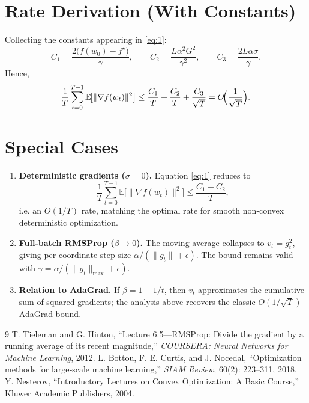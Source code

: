 \documentclass[11pt]{article}
\newcommand{\E}{\mathbb{E}}
\begin{document}
\section*{Rate Derivation (With Constants)}
Collecting the constants appearing in \eqref{eq:1}:
\[
C_{1}= \frac{2\big(f(w_0)-f^\star\big)}{\gamma},\qquad
C_{2}= \frac{L\alpha^{2} G^{2}}{\gamma^{2}},\qquad
C_{3}= \frac{2L\alpha\sigma}{\gamma}.
\]
Hence,
\[
\frac{1}{T}\sum_{t=0}^{T-1}\E\!\big[\|\nabla f(w_t)\|^{2}\big]
\le \frac{C_{1}}{T}+\frac{C_{2}}{T}+ \frac{C_{3}}{\sqrt{T}}
= O\!\Bigl(\frac{1}{\sqrt{T}}\Bigr).
\]

\section*{Special Cases}
\begin{enumerate}[label=\arabic*.]
\item \textbf{Deterministic gradients ($\sigma=0$).} Equation \eqref{eq:1} reduces to
\[
\frac{1}{T}\sum_{t=0}^{T-1}\E\!\big[\|\nabla f(w_t)\|^{2}\big]
\le \frac{C_{1}+C_{2}}{T},
\]
i.e. an $O(1/T)$ rate, matching the optimal rate for smooth non‑convex deterministic optimization.
\item \textbf{Full‑batch RMSProp ($\beta\to 0$).} The moving average collapses to $v_t=g_t^{2}$, giving per‑coordinate step size $\alpha/(\|g_t\|+\epsilon)$. The bound remains valid with $\gamma=\alpha/(\|g_t\|_{\max}+\epsilon)$.
\item \textbf{Relation to AdaGrad.} If $\beta=1-1/t$, then $v_t$ approximates the cumulative sum of squared gradients; the analysis above recovers the classic $O(1/\sqrt{T})$ AdaGrad bound.
\end{enumerate}

\newpage
\begin{thebibliography}{9}
T. Tieleman and G. Hinton, ``Lecture 6.5—RMSProp: Divide the gradient by a running average of its recent magnitude,'' \emph{COURSERA: Neural Networks for Machine Learning}, 2012.
L. Bottou, F. E. Curtis, and J. Nocedal, ``Optimization methods for large‑scale machine learning,'' \emph{SIAM Review}, 60(2): 223–311, 2018.
Y. Nesterov, ``Introductory Lectures on Convex Optimization: A Basic Course,'' Kluwer Academic Publishers, 2004.
\end{thebibliography}
\end{document}
